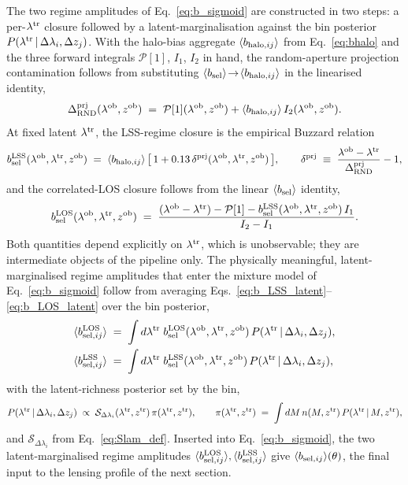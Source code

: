 \documentclass[a4paper, 11pt]{article}
\newcommand{\lob}{\lambda^{\rm ob}}
\newcommand{\ltr}{\lambda^{\rm tr}}
\newcommand{\zob}{z^{\rm ob}}
\newcommand{\ztr}{z^{\rm tr}}
\newcommand{\dprj}{\Delta^{\rm prj}}
\newcommand{\Pop}{\mathcal{P}}
\newcommand{\bLOS}{b_{\rm sel}^{\rm LOS}}
\newcommand{\bLSS}{b_{\rm sel}^{\rm LSS}}
\newcommand{\bbsel}{\avg{b_{\rm sel}}}
\newcommand{\bbselij}{\avg{b_{{\rm sel},ij}}}
\newcommand{\bbLOSij}{\avg{b_{{\rm sel},ij}^{\rm LOS}}}
\newcommand{\bbLSSij}{\avg{b_{{\rm sel},ij}^{\rm LSS}}}
\newcommand{\bbhaloij}{\avg{b_{{\rm halo},ij}}}
\newcommand{\avg}[1]{\langle #1 \rangle}
\begin{document}
The two regime amplitudes of Eq.~\eqref{eq:b_sigmoid} are constructed
in two steps: a per-$\ltr$ closure followed by a
latent-marginalisation against the bin posterior
$P(\ltr\,|\,\Delta\lambda_i,\Delta z_j)$.  With the halo-bias aggregate
$\bbhaloij$ from Eq.~\eqref{eq:bhalo} and the three forward
integrals $\Pop[1]$, $I_1$, $I_2$ in hand, the random-aperture
projection contamination follows from substituting
$\bbsel\!\to\!\bbhaloij$ in the linearised identity,
\begin{equation}
\dprj_{\rm RND}(\lob,\zob) \;=\; \Pop[1](\lob,\zob)
                              + \bbhaloij\,I_2(\lob,\zob) .
\label{eq:dprj_rnd}
\end{equation}
At fixed latent $\ltr$, the LSS-regime closure is the empirical
Buzzard relation
\begin{equation}
\bLSS(\lob,\ltr,\zob) \;=\; \bbhaloij\,
  \bigl[\,1 + 0.13\,\delta^{\rm prj}(\lob,\ltr,\zob)\,\bigr] ,
\qquad
\delta^{\rm prj} \;\equiv\; \frac{\lob-\ltr}{\dprj_{\rm RND}} - 1 ,
\label{eq:b_LSS_latent}
\end{equation}
and the correlated-LOS closure follows from the linear $\bbsel$ identity,
\begin{equation}
\bLOS(\lob,\ltr,\zob) \;=\;
\frac{(\lob-\ltr) - \Pop[1] - \bLSS(\lob,\ltr,\zob)\,I_1}{I_2 - I_1} .
\label{eq:b_LOS_latent}
\end{equation}
Both quantities depend explicitly on $\ltr$, which is unobservable;
they are intermediate objects of the pipeline only.  The physically
meaningful, latent-marginalised regime amplitudes that enter the
mixture model of Eq.~\eqref{eq:b_sigmoid} follow from averaging
Eqs.~\eqref{eq:b_LSS_latent}--\eqref{eq:b_LOS_latent} over the bin
posterior,
\begin{equation}
\begin{aligned}
\bbLOSij &\;=\;
\int d\ltr \; \bLOS(\lob,\ltr,\zob)\,
P(\ltr\,|\,\Delta\lambda_i,\Delta z_j) , \\
\bbLSSij &\;=\;
\int d\ltr \; \bLSS(\lob,\ltr,\zob)\,
P(\ltr\,|\,\Delta\lambda_i,\Delta z_j) ,
\end{aligned}
\label{eq:b_marg_lt}
\end{equation}
with the latent-richness posterior set by the bin,
\begin{equation}
P(\ltr\,|\,\Delta\lambda_i,\Delta z_j) \;\propto\;
\mathcal{S}_{\Delta\lambda_i}(\ltr,\ztr)\,\pi(\ltr,\ztr) ,
\qquad
\pi(\ltr,\ztr) \;=\; \int dM\,n(M,\ztr)\,P(\ltr\,|\,M,\ztr) ,
\label{eq:plt_post}
\end{equation}
and $\mathcal{S}_{\Delta\lambda_i}$ from Eq.~\eqref{eq:Slam_def}.
Inserted into Eq.~\eqref{eq:b_sigmoid}, the two
latent-marginalised regime amplitudes
$\bbLOSij,\bbLSSij$ give $\bbselij(\theta)$, the
final input to the lensing profile of the next section.
\end{document}
